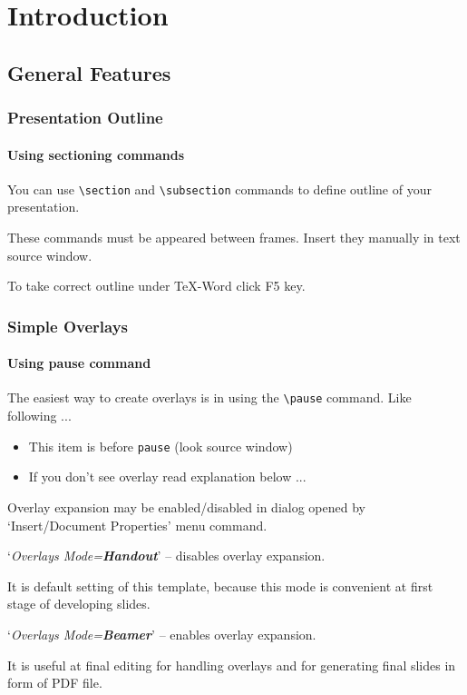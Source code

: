 \documentclass{beamer}
\begin{document}
\section{Introduction}

\subsection{General Features}

\begin{frame}
  \frametitle{Presentation Outline}
  \framesubtitle{Using sectioning commands}

  You can use \texttt{\textbackslash section}
  and \texttt{\textbackslash subsection} commands
  to define outline of your presentation.

  These commands must be appeared between frames.
  Insert they manually in text source window. 

  To take correct outline under \TeX-Word click F5 key.

\end{frame}

\begin{frame}
  \frametitle{Simple Overlays}
  \framesubtitle{Using pause command}

  The easiest way to create overlays is in using 
  the \texttt{\textbackslash pause} command.
  Like following ...

  \begin{itemize}
    \item This item is before \texttt{pause} (look source window)\pause
    \item If you don't see overlay read explanation below ...
  \end{itemize}

  Overlay expansion may be enabled/disabled 
  in dialog opened by `Insert/Document Properties' menu command.

  `\textit{Overlays Mode=\textbf{Handout}}' 
   -- disables overlay expansion.

  It is default setting of this template, 
  because this mode is convenient at
  first stage of developing slides.

  `\textit{Overlays Mode=\textbf{Beamer}}' 
   -- enables overlay expansion.

  It is useful at final editing 
  for handling overlays and for generating 
  final slides in form of PDF file.

\end{frame}
\end{document}
